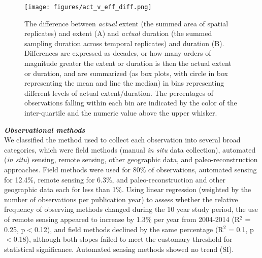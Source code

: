 \documentclass[12pt]{article}
\begin{document}
\begin{figure}[ht]
\texttt{[image: figures/act\_v\_eff\_diff.png]}
\vspace{-0.2 cm}
\caption{The difference between \emph{actual} extent (the summed area of spatial replicates) and extent (A) and \emph{actual} duration (the summed sampling duration across temporal replicates) and duration (B).  Differences are expressed as decades, or how many orders of magnitude greater the extent or duration is then the actual extent or duration, and are summarized (as box plots, with circle in box representing the mean and line the median) in bins representing different levels of actual extent/duration.  The percentages of observations falling within each bin are indicated by the color of the inter-quartile and the numeric value above the upper whisker.}
\label{afoto1}
\end{figure}


\noindent \textbf{\emph{Observational methods}}\\
We classified the method used to collect each observation into several broad categories, which were field methods (manual \emph{in situ} data collection), automated (\emph{in situ}) sensing, remote sensing, other geographic data, and paleo-reconstruction approaches. Field methods were used for 80\% of observations, automated sensing for 12.4\%, remote sensing for 6.3\%, and paleo-reconstruction and other geographic data each for less than 1\%. Using linear regression (weighted by the number of observations per publication year) to assess whether the relative frequency of observing methods changed during the 10 year study period, the use of remote sensing appeared to increase by 1.3\% per year from 2004-2014 (R$^2$ = 0.25, p$<$0.12), and field methods declined by the same percentage (R$^2$ = 0.1, p$<$0.18), although both slopes failed to meet the customary threshold for statistical significance. Automated sensing methods showed no trend (SI). 
\end{document}
